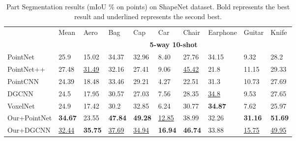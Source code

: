 \documentclass{article}
\begin{document}
\begin{table}[h]
  \caption{Part Segmentation results (mIoU \% on points) on ShapeNet dataset. Bold represents the best result and underlined represents the second best.}
  \label{part3}
  \centering
  \normalsize
  \setlength{\tabcolsep}{4.5pt}
  \begin{tabular}{llllllllll}
    \toprule
    
    &Mean&Aero&Bag&Cap&Car&Chair&Earphone&Guitar&Knife\\

    \cmidrule(r){2-10}
    

    & \multicolumn{9}{c}{\textbf{5-way 10-shot}}\\
    \cmidrule(r){2-10}
    PointNet &25.9 &15.02 &34.37 &32.96 &8.40 &27.76 &34.15 &9.32 &28.2 \\
    PointNet++ &27.48 &\underline{31.49} &32.16 &27.41 &9.06 &\underline{45.42} &21.8 &11.15 &29.33 \\
    PointCNN &24.39 &18.48 &33.46 &29.21 &4.27 &22.51 &31.3 &10.73 &27.69 \\
    DGCNN &24.5 &17.95 &30.57 &27.03 &7.56 &28.35 &\underline{34.8} &9.53 &27.65\\ 
    
    VoxelNet &24.9 &17.42 &30.2 &32.85 &6.24 &30.77 &\textbf{34.87} &7.62 &25.97 \\
    \midrule
    Our+PointNet &\textbf{34.67} &23.55 &\textbf{47.84} &\textbf{49.28} &\underline{12.85} &38.99 &32.26 &\textbf{31.16} &\textbf{51.69} \\
    Our+DGCNN  &\underline{32.44} &\textbf{35.75} &\underline{37.69} &\underline{34.94} &\textbf{16.94} &\textbf{46.74} &33.88 &\underline{15.75} &\underline{49.95} \\ 
    \bottomrule
  \end{tabular}
\end{table}
\end{document}
